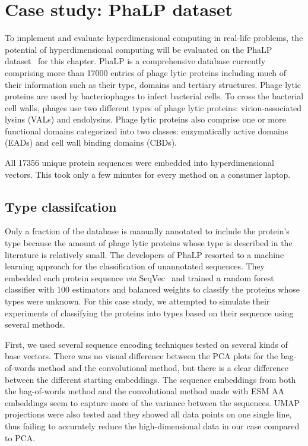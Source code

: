 \section{Case study: PhaLP dataset}
To implement and evaluate hyperdimensional computing in real-life problems, the potential of hyperdimensional computing will be evaluated on the PhaLP dataset~\cite{phalp} for this chapter. PhaLP is a comprehensive database currently comprising more than 17000 entries of phage lytic proteins including much of their information such as their type, domains and tertiary structures. Phage lytic proteins are used by bacteriophages to infect bacterial cells. To cross the bacterial cell walls, phages use two different types of phage lytic proteins: virion-associated lysins (VALs) and endolysins. Phage lytic proteins also comprise one or more functional domains categorized into two classes: enzymatically active domains (EADs) and cell wall binding domains (CBDs).

All 17356 unique protein sequences were embedded into hyperdimensional vectors. This took only a few minutes for every method on a consumer laptop.

\subsection*{Type classifcation}
Only a fraction of the database is manually annotated to include the protein's type because the amount of phage lytic proteins whose type is described in the literature is relatively small. The developers of PhaLP resorted to a machine learning approach for the classification of unannotated sequences. They embedded each protein sequence \textit{via} SeqVec~\cite{seqvec} and trained a random forest classifier with 100 estimators and balanced weights to classify the proteins whose types were unknown. For this case study, we attempted to simulate their experiments of classifying the proteins into types based on their sequence using several methods. 

First, we used several sequence encoding techniques tested on several kinds of base vectors. There was no visual difference between the PCA plots for the bag-of-words method and the convolutional method, but there is a clear difference between the different starting embeddings. The sequence embeddings from both the bag-of-words method and the convolutional method made with ESM AA embeddings seem to capture more of the variance between the sequences. UMAP projections were also tested and they showed all data points on one single line, thus failing to accurately reduce the high-dimensional data in our case compared to PCA.

